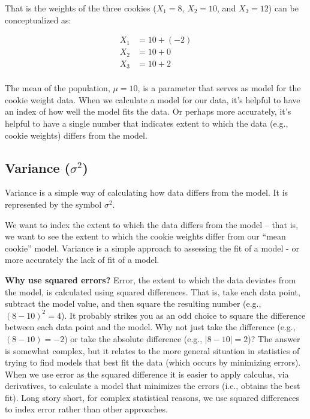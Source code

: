 \documentclass[
]{krantz}
\begin{document}
That is the weights of the three cookies (\(X_1 = 8\), \(X_2 = 10\), and \(X_3 = 12\)) can be conceptualized as:

\[
\begin{aligned} 
X_1 &= 10 + (-2) \\
X_2 &= 10 + 0 \\
X_3 &= 10 + 2 \\
\end{aligned} 
\]

The mean of the population, \(\mu = 10\), is a parameter that serves as model for the cookie weight data. When we calculate a model for our data, it's helpful to have an index of how well the model fits the data. Or perhaps more accurately, it's helpful to have a single number that indicates extent to which the data (e.g., cookie weights) differs from the model.

\hypertarget{variance-sigma2}{%
\subsection{\texorpdfstring{Variance (\(\sigma^2\))}{Variance (\textbackslash sigma\^{}2)}}\label{variance-sigma2}}

Variance is a simple way of calculating how data differs from the model. It is represented by the symbol \(\sigma^2\).

We want to index the extent to which the data differs from the model -- that is, we want to see the extent to which the cookie weights differ from our ``mean cookie'' model. Variance is a simple approach to assessing the fit of a model - or more accurately the lack of fit of a model.

\textbf{Why use squared errors?} Error, the extent to which the data deviates from the model, is calculated using squared differences. That is, take each data point, subtract the model value, and then square the resulting number (e.g., \((8 - 10)^2 = 4\)). It probably strikes you as an odd choice to square the difference between each data point and the model. Why not just take the difference (e.g., \((8 - 10) = -2\)) or take the absolute difference (e.g., \(|8 - 10|= 2\))? The answer is somewhat complex, but it relates to the more general situation in statistics of trying to find models that best fit the data (which occurs by minimizing errors). When we use error as the squared difference it is easier to apply calculus, via derivatives, to calculate a model that minimizes the errors (i.e., obtains the best fit). Long story short, for complex statistical reasons, we use squared differences to index error rather than other approaches.
\end{document}
